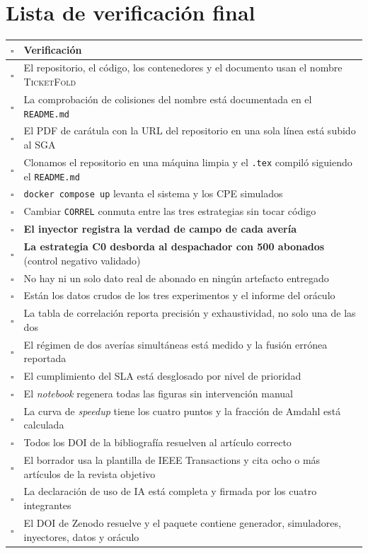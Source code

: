 \documentclass[11pt,a4paper]{article}
\begin{document}
\section{Lista de verificación final}

\begin{center}
	\small
	\begin{tabular}{@{}p{0.7cm}p{14.3cm}@{}}
		\toprule
		\textbf{$\square$} & \textbf{Verificación} \\
		\midrule
		$\square$ & El repositorio, el código, los contenedores y el documento usan el nombre \textsc{TicketFold} \\
		$\square$ & La comprobación de colisiones del nombre está documentada en el \texttt{README.md} \\
		$\square$ & El PDF de carátula con la URL del repositorio en una sola línea está subido al SGA \\
		$\square$ & Clonamos el repositorio en una máquina limpia y el \texttt{.tex} compiló siguiendo el \texttt{README.md} \\
		$\square$ & \texttt{docker compose up} levanta el sistema y los CPE simulados \\
		$\square$ & Cambiar \texttt{CORREL} conmuta entre las tres estrategias sin tocar código \\
		$\square$ & \textbf{El inyector registra la verdad de campo de cada avería} \\
		$\square$ & \textbf{La estrategia C0 desborda al despachador con 500 abonados} (control negativo validado) \\
		$\square$ & No hay ni un solo dato real de abonado en ningún artefacto entregado \\
		$\square$ & Están los datos crudos de los tres experimentos y el informe del oráculo \\
		$\square$ & La tabla de correlación reporta precisión y exhaustividad, no solo una de las dos \\
		$\square$ & El régimen de dos averías simultáneas está medido y la fusión errónea reportada \\
		$\square$ & El cumplimiento del SLA está desglosado por nivel de prioridad \\
		$\square$ & El \emph{notebook} regenera todas las figuras sin intervención manual \\
		$\square$ & La curva de \emph{speedup} tiene los cuatro puntos y la fracción de Amdahl está calculada \\
		$\square$ & Todos los DOI de la bibliografía resuelven al artículo correcto \\
		$\square$ & El borrador usa la plantilla de IEEE Transactions y cita ocho o más artículos de la revista objetivo \\
		$\square$ & La declaración de uso de IA está completa y firmada por los cuatro integrantes \\
		$\square$ & El DOI de Zenodo resuelve y el paquete contiene generador, simuladores, inyectores, datos y oráculo \\
		\bottomrule
	\end{tabular}
\end{center}
\end{document}
